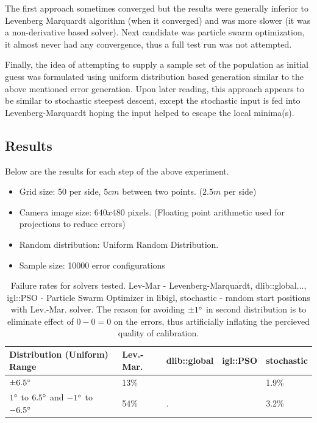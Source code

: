 \documentclass[english, printversion, nomenclature, notitle]{tuvisionthesis} %
\begin{document}
The first approach sometimes converged but the results were generally inferior to Levenberg Marquardt algorithm (when it converged) and was more slower (it was a non-derivative based solver). Next candidate was particle swarm optimization, it almost never had any convergence, thus a full test run was not attempted.

Finally, the idea of attempting to supply a sample set of the population as initial guess was formulated using uniform distribution based generation similar to the above mentioned error generation. Upon later reading, this approach appears to be similar to stochastic steepest descent, except the stochastic input is fed into Levenberg-Marquardt hoping the input helped to escape the local minima(s). 

\subsection{Results}

Below are the results for each step of the above experiment.  

\begin{itemize}
	\item Grid size: 50 per side, $5cm$ between two points. ($2.5m$ per side)
	\item Camera image size: $640 x 480$ pixels. (Floating point arithmetic used for projections to reduce errors)
	\item Random distribution: Uniform Random Distribution.
	\item Sample size: 10000 error configurations
\end{itemize}

\begin{table}[]
	\begin{tabular}{|l|l|l|l|l|}
		\hline
	Distribution (Uniform) Range & Lev.-Mar.  & dlib::global & igl::PSO & stochastic \\
	\hline
	$\pm6.5\degree$& 13\% &  &  & 1.9\% \\
	$1\degree$ to $6.5\degree$ and $-1\degree$ to $-6.5\degree$	& 54\% & . &  &3.2\% \\ \hline

	\end{tabular}
\caption{Failure rates for solvers tested. Lev-Mar - Levenberg-Marquardt, dlib::global..., igl::PSO - Particle Swarm Optimizer in libigl, stochastic - random start positions with Lev.-Mar. solver. The reason for avoiding $\pm1\degree$ in second distribution is to eliminate effect of $0 - 0 = 0$ on the errors, thus artificially inflating the percieved quality of calibration.}
\end{table}
\end{document}
